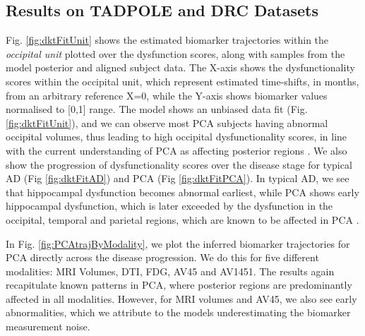 \subsection{Results on TADPOLE and DRC Datasets}
\label{sec:dktResTadDrc}

Fig. \ref{fig:dktFitUnit} shows the estimated biomarker trajectories within the \emph{occipital unit} plotted over the dysfunction scores, along with samples from the model posterior and aligned subject data. The X-axis shows the dysfunctionality scores within the occipital unit, which represent estimated time-shifts, in months, from an arbitrary reference X=0, while the Y-axis shows biomarker values normalised to [0,1] range. The model shows an unbiased data fit (Fig. \ref{fig:dktFitUnit}), and we can observe most PCA subjects having abnormal occipital volumes, thus leading to high occipital dysfunctionality scores, in line with the current understanding of PCA as affecting posterior regions \cite{crutch2012posterior}. We also show the progression of dysfunctionality scores over the disease stage for typical AD (Fig \ref{fig:dktFitAD}) and PCA (Fig \ref{fig:dktFitPCA}). In typical AD, we see that hippocampal dysfunction becomes abnormal earliest, while PCA shows early hippocampal dysfunction, which is later exceeded by the dysfunction in the occipital, temporal and parietal regions, which are known to be affected in PCA \cite{crutch2012posterior,Baron2001}. 

In Fig. \ref{fig:PCAtrajByModality}, we plot the inferred biomarker trajectories for PCA directly across the disease progression. We do this for five different modalities: MRI Volumes, DTI, FDG, AV45 and AV1451. The results again recapitulate known patterns in PCA, where posterior regions are predominantly affected in all modalities. However, for MRI volumes and AV45, we also see early abnormalities, which we attribute to the models underestimating the biomarker measurement noise.


